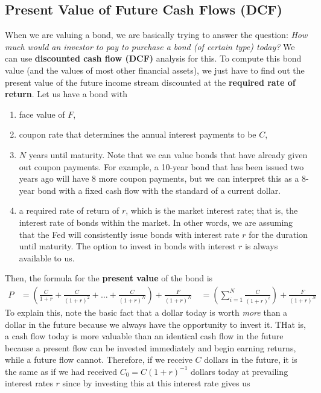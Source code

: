\documentclass{article}
\begin{document}
  \subsection{Present Value of Future Cash Flows (DCF)}

    When we are valuing a bond, we are basically trying to answer the question: \textit{How much would an investor to pay to purchase a bond (of certain type) today?} We can use \textbf{discounted cash flow (DCF)} analysis for this. To compute this bond value (and the values of most other financial assets), we just have to find out the present value of the future income stream discounted at the \textbf{required rate of return}. Let us have a bond with

    \begin{enumerate}
      \item face value of $F$,
      \item coupon rate that determines the annual interest payments to be $C$,
      \item $N$ years until maturity. Note that we can value bonds that have already given out coupon payments. For example, a 10-year bond that has been issued two years ago will have 8 more coupon payments, but we can interpret this as a 8-year bond with a fixed cash flow with the standard of a current dollar.
      \item a required rate of return of $r$, which is the market interest rate; that is, the interest rate of bonds within the market. In other words, we are assuming that the Fed will consistently issue bonds with interest rate $r$ for the duration until maturity. The option to invest in bonds with interest $r$ is always available to us.
    \end{enumerate}
    Then, the formula for the \textbf{present value} of the bond is
    \begin{align*}
      P & = \left( \frac{C}{1 + r} + \frac{C}{(1+r)^2} + \ldots + \frac{C}{(1+r)^N} \right) + \frac{F}{(1+r)^N} \
      & = \left( \sum_{i=1}^N \frac{C}{(1+r)^i} \right) + \frac{F}{(1+r)^N}
    \end{align*}
    To explain this, note the basic fact that a dollar today is worth \textit{more} than a dollar in the future because we always have the opportunity to invest it. THat is, a cash flow today is more valuable than an identical cash flow in the future because a present flow can be invested immediately and begin earning returns, while a future flow cannot. Therefore, if we receive $C$ dollars in the future, it is the same as if we had received $C_0 = C (1 + r)^{-1}$ dollars today at prevailing interest rates $r$ since by investing this at this interest rate gives us
\end{document}
